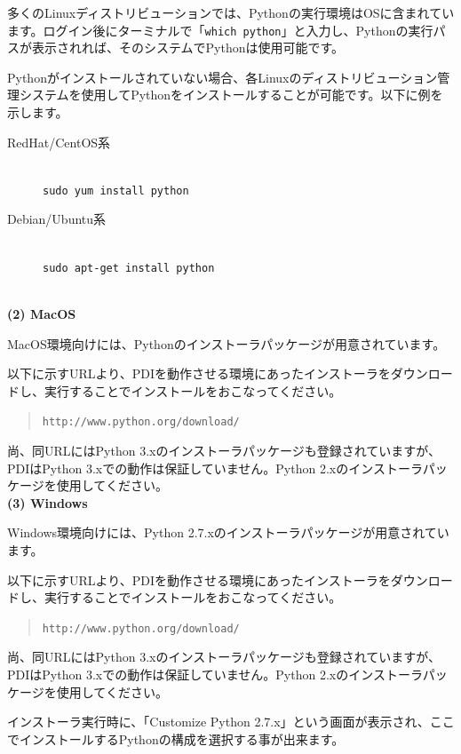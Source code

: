\documentclass[a4paper,11pt]{jarticle}
\begin{document}
多くのLinuxディストリビューションでは、Pythonの実行環境はOSに含まれています。ログイン後にターミナルで「{\tt which python}」と入力し、Pythonの実行パスが表示されれば、そのシステムでPythonは使用可能です。

Pythonがインストールされていない場合、各Linuxのディストリビューション管理システムを使用してPythonをインストールすることが可能です。以下に例を示します。

\begin{description}
\item[RedHat/CentOS系] {\ } \\
{\tt sudo yum install python} \\
\item[Debian/Ubuntu系] {\ } \\
{\tt sudo apt-get install python}\\
\end{description}
{\ }\\


\textbf{(2) MacOS}

MacOS環境向けには、Pythonのインストーラパッケージが用意されています。

以下に示すURLより、PDIを動作させる環境にあったインストーラをダウンロードし、実行することでインストールをおこなってください。
\begin{quote}
{\tt http://www.python.org/download/}
\end{quote}
尚、同URLにはPython 3.xのインストーラパッケージも登録されていますが、PDIはPython
3.xでの動作は保証していません。Python 2.xのインストーラパッケージを使用してください。
{\ }\\


\textbf{(3) Windows}

Windows環境向けには、Python 2.7.xのインストーラパッケージが用意されています。

以下に示すURLより、PDIを動作させる環境にあったインストーラをダウンロードし、実行することでインストールをおこなってください。
\begin{quote}
{\tt http://www.python.org/download/}
\end{quote}
尚、同URLにはPython 3.xのインストーラパッケージも登録されていますが、PDIはPython
3.xでの動作は保証していません。Python 2.xのインストーラパッケージを使用してください。

インストーラ実行時に、「Customize Python 2.7.x」という画面が表示され、ここでインストールするPythonの構成を選択する事が出来ます。
\end{document}
